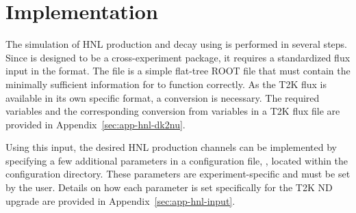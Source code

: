     \section{Implementation}
    \label{sec:hnl-impl}
        The simulation of HNL production and decay using  is performed in several steps.
        Since  is designed to be a cross-experiment package, it requires a standardized flux input in the  format. 
        The  file is a simple flat-tree ROOT file that must contain the minimally sufficient information for  to function correctly.
        As the T2K flux is available in its own specific format, a conversion is necessary. 
        The required  variables and the corresponding conversion from variables in a T2K flux file are provided in Appendix~\ref{sec:app-hnl-dk2nu}.

        Using this input, the desired HNL production channels can be implemented by specifying a few additional parameters in a configuration  file, , located within the  configuration directory. 
        These parameters are experiment-specific and must be set by the user. Details on how each parameter is set specifically for the T2K ND upgrade are provided in Appendix~\ref{sec:app-hnl-input}. 

